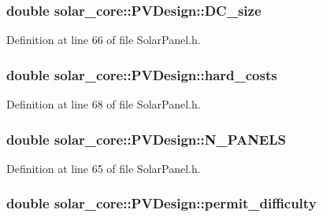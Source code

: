 \subsubsection[{D\+C\+\_\+size}]{\setlength{\rightskip}{0pt plus 5cm}double solar\+\_\+core\+::\+P\+V\+Design\+::\+D\+C\+\_\+size}\label{classsolar__core_1_1_p_v_design_a21148518ef58004be10b91dc75fdd5b5}


Definition at line 66 of file Solar\+Panel.\+h.

\hypertarget{classsolar__core_1_1_p_v_design_a18cec349cd8f04efcb67562e30416860}{}
\subsubsection[{hard\+\_\+costs}]{\setlength{\rightskip}{0pt plus 5cm}double solar\+\_\+core\+::\+P\+V\+Design\+::hard\+\_\+costs}\label{classsolar__core_1_1_p_v_design_a18cec349cd8f04efcb67562e30416860}


Definition at line 68 of file Solar\+Panel.\+h.

\hypertarget{classsolar__core_1_1_p_v_design_abef277ad010afb4ab6c6c13113a8c017}{}
\subsubsection[{N\+\_\+\+P\+A\+N\+E\+L\+S}]{\setlength{\rightskip}{0pt plus 5cm}double solar\+\_\+core\+::\+P\+V\+Design\+::\+N\+\_\+\+P\+A\+N\+E\+L\+S}\label{classsolar__core_1_1_p_v_design_abef277ad010afb4ab6c6c13113a8c017}


Definition at line 65 of file Solar\+Panel.\+h.

\hypertarget{classsolar__core_1_1_p_v_design_a8c2897033c697a6dcfb96787358dc64f}{}
\subsubsection[{permit\+\_\+difficulty}]{\setlength{\rightskip}{0pt plus 5cm}double solar\+\_\+core\+::\+P\+V\+Design\+::permit\+\_\+difficulty}\label{classsolar__core_1_1_p_v_design_a8c2897033c697a6dcfb96787358dc64f}


